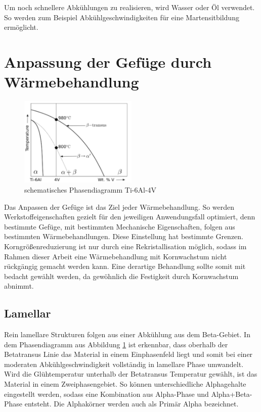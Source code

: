 \documentclass[a4paper, 11pt]{tubsreprt}
\begin{document}
Um noch schnellere Abkühlungen zu realisieren, wird Wasser oder Öl verwendet. So werden zum Beispiel Abkühlgeschwindigkeiten für eine Martensitbildung ermöglicht.


\section{Anpassung der Gefüge durch Wärmebehandlung}
\begin{figure}
	\centering
	\includegraphics[width=0.5\textwidth]{Bilder/Phasendiagram.PNG}
	\caption[Phasendiagramm]{schematisches Phasendiagramm Ti-6Al-4V \cite{Babu2008}}
	\label{Phasendiagram}
\end{figure}

Das Anpassen der Gefüge ist das Ziel jeder Wärmebehandlung. So werden Werkstoffeigenschaften gezielt für den jeweiligen Anwendungsfall optimiert, denn bestimmte Gefüge, mit bestimmten Mechanische Eigenschaften, folgen aus bestimmten Wärmebehandlungen. Diese Einstellung hat bestimmte Grenzen. Korngrößenreduzierung ist nur durch eine Rekristallisation möglich, sodass im Rahmen dieser Arbeit eine Wärmebehandlung mit Kornwachstum nicht rückgängig gemacht werden kann. Eine derartige Behandlung sollte somit mit bedacht gewählt werden, da gewöhnlich die Festigkeit durch Kornwachstum abnimmt.
\subsection{Lamellar}
Rein lamellare Strukturen folgen aus einer Abkühlung aus dem Beta-Gebiet. In dem Phasendiagramm aus Abbildung \ref{Phasendiagram} ist erkennbar, dass oberhalb der Betatransus Linie das Material in einem Einphasenfeld liegt und somit bei einer moderaten Abkühlgeschwindigkeit vollständig in lamellare Phase umwandelt. Wird die Glühtemperatur unterhalb der Betatransus Temperatur gewählt, ist das Material in einem Zweiphasengebiet. So können unterschiedliche Alphagehalte eingestellt werden, sodass eine Kombination aus Alpha-Phase und Alpha+Beta-Phase entsteht. Die Alphakörner werden auch als Primär Alpha bezeichnet.
\end{document}
